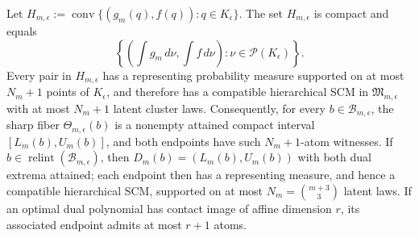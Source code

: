Let \(H_{m,\epsilon}:=\operatorname{conv}\{(g_m(q),f(q)):q\in K_{\epsilon}\}\). The set \(H_{m,\epsilon}\) is compact and equals
\[
 \left\{\left(\int g_m\,d\nu,\int f\,d\nu\right):
 \nu\in\mathcal P(K_{\epsilon})\right\}.
\]
Every pair in \(H_{m,\epsilon}\) has a representing probability measure supported on at most \(N_m+1\) points of \(K_{\epsilon}\), and therefore has a compatible hierarchical SCM in \(\mathfrak M_{m,\epsilon}\) with at most \(N_m+1\) latent cluster laws. Consequently, for every \(b\in\mathcal B_{m,\epsilon}\), the sharp fiber \(\Theta_{m,\epsilon}(b)\) is a nonempty attained compact interval \([L_m(b),U_m(b)]\), and both endpoints have such \(N_m+1\)-atom witnesses. If \(b\in\operatorname{relint}(\mathcal B_{m,\epsilon})\), then \(D_m(b)=(L_m(b),U_m(b))\) with both dual extrema attained; each endpoint then has a representing measure, and hence a compatible hierarchical SCM, supported on at most \(N_m={m+3\choose3}\) latent laws. If an optimal dual polynomial has contact image of affine dimension \(r\), its associated endpoint admits at most \(r+1\) atoms.